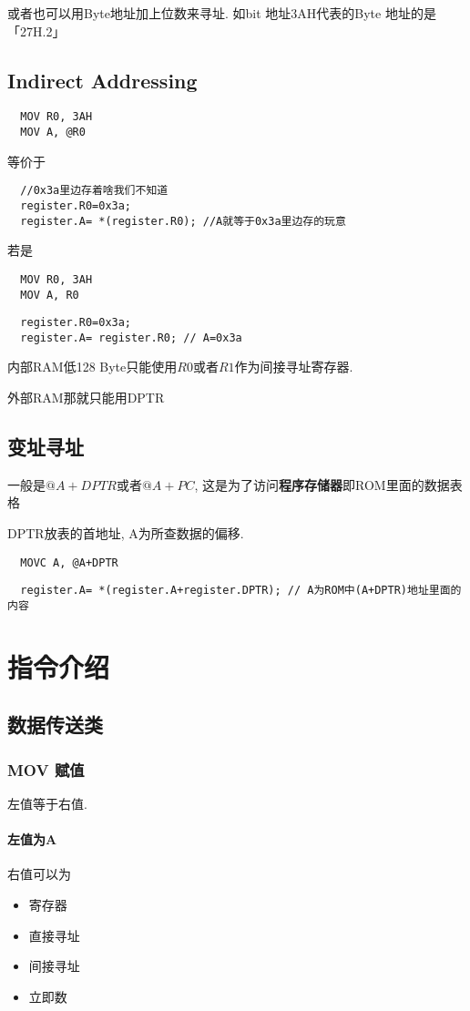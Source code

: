 \documentclass[a4paper]{report}
\begin{document}
或者也可以用Byte地址加上位数来寻址. 如bit 地址3AH代表的Byte 地址的是「27H.2」
\subsection{Indirect Addressing}
\begin{verbatim}
  MOV R0, 3AH
  MOV A, @R0
\end{verbatim}
等价于
\begin{verbatim}
  //0x3a里边存着啥我们不知道
  register.R0=0x3a;
  register.A= *(register.R0); //A就等于0x3a里边存的玩意
\end{verbatim}
若是
\begin{verbatim}
  MOV R0, 3AH
  MOV A, R0
\end{verbatim}
\begin{verbatim}
  register.R0=0x3a;
  register.A= register.R0; // A=0x3a
\end{verbatim}
内部RAM低128 Byte只能使用$R0$或者$R1$作为间接寻址寄存器. 

外部RAM那就只能用DPTR
\subsection{变址寻址}
一般是$@A+DPTR$或者$@A+PC$, 这是为了访问\textbf{程序存储器}即ROM里面的数据表格

DPTR放表的首地址, A为所查数据的偏移. 
\begin{verbatim}
  MOVC A, @A+DPTR
\end{verbatim}
\begin{verbatim}
  register.A= *(register.A+register.DPTR); // A为ROM中(A+DPTR)地址里面的内容
\end{verbatim}
\section{指令介绍}
\subsection{数据传送类}
\subsubsection{MOV 赋值}
左值等于右值. 
\paragraph{左值为A} 右值可以为
\begin{itemize}
  \item 寄存器
  \item 直接寻址
  \item 间接寻址
  \item 立即数
\end{itemize}
\end{document}
